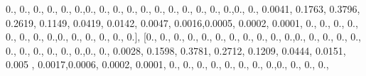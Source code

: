 \documentclass[
]{book}
\newenvironment{Shaded}{\begin{snugshade}}{\end{snugshade}}
\newcommand{\FloatTok}[1]{\textcolor[rgb]{0.00,0.00,0.81}{#1}}
\newcommand{\NormalTok}[1]{#1}
\begin{document}
\begin{Shaded}
\begin{Highlighting}[]
\FloatTok{0.}\NormalTok{, }\FloatTok{0.}\NormalTok{, }\FloatTok{0.}\NormalTok{, }\FloatTok{0.}\NormalTok{, }\FloatTok{0.}\NormalTok{, }\FloatTok{0.}\NormalTok{,}\FloatTok{0.}\NormalTok{, }\FloatTok{0.}\NormalTok{, }\FloatTok{0.}\NormalTok{, }\FloatTok{0.}\NormalTok{, }\FloatTok{0.}\NormalTok{, }\FloatTok{0.}\NormalTok{, }\FloatTok{0.}\NormalTok{, }\FloatTok{0.}\NormalTok{, }\FloatTok{0.}\NormalTok{, }\FloatTok{0.}\NormalTok{, }\FloatTok{0.}\NormalTok{,}\FloatTok{0.}\NormalTok{, }\FloatTok{0.}\NormalTok{,}
\FloatTok{0.0041}\NormalTok{, }\FloatTok{0.1763}\NormalTok{, }\FloatTok{0.3796}\NormalTok{, }\FloatTok{0.2619}\NormalTok{, }\FloatTok{0.1149}\NormalTok{, }\FloatTok{0.0419}\NormalTok{, }\FloatTok{0.0142}\NormalTok{, }\FloatTok{0.0047}\NormalTok{, }\FloatTok{0.0016}\NormalTok{,}\FloatTok{0.0005}\NormalTok{,}
\FloatTok{0.0002}\NormalTok{, }\FloatTok{0.0001}\NormalTok{, }\FloatTok{0.}\NormalTok{, }\FloatTok{0.}\NormalTok{, }\FloatTok{0.}\NormalTok{, }\FloatTok{0.}\NormalTok{, }\FloatTok{0.}\NormalTok{, }\FloatTok{0.}\NormalTok{, }\FloatTok{0.}\NormalTok{, }\FloatTok{0.}\NormalTok{,}\FloatTok{0.}\NormalTok{, }\FloatTok{0.}\NormalTok{, }\FloatTok{0.}\NormalTok{, }\FloatTok{0.}\NormalTok{, }\FloatTok{0.}\NormalTok{, }\FloatTok{0.}\NormalTok{], [}\FloatTok{0.}\NormalTok{, }\FloatTok{0.}\NormalTok{,}
\FloatTok{0.}\NormalTok{, }\FloatTok{0.}\NormalTok{, }\FloatTok{0.}\NormalTok{, }\FloatTok{0.}\NormalTok{, }\FloatTok{0.}\NormalTok{, }\FloatTok{0.}\NormalTok{, }\FloatTok{0.}\NormalTok{, }\FloatTok{0.}\NormalTok{, }\FloatTok{0.}\NormalTok{,}\FloatTok{0.}\NormalTok{, }\FloatTok{0.}\NormalTok{, }\FloatTok{0.}\NormalTok{, }\FloatTok{0.}\NormalTok{, }\FloatTok{0.}\NormalTok{, }\FloatTok{0.}\NormalTok{, }\FloatTok{0.}\NormalTok{, }\FloatTok{0.}\NormalTok{, }\FloatTok{0.}\NormalTok{, }\FloatTok{0.}\NormalTok{,}
\FloatTok{0.}\NormalTok{,}\FloatTok{0.}\NormalTok{, }\FloatTok{0.}\NormalTok{, }\FloatTok{0.0028}\NormalTok{, }\FloatTok{0.1598}\NormalTok{, }\FloatTok{0.3781}\NormalTok{, }\FloatTok{0.2712}\NormalTok{, }\FloatTok{0.1209}\NormalTok{, }\FloatTok{0.0444}\NormalTok{, }\FloatTok{0.0151}\NormalTok{, }\FloatTok{0.005}\NormalTok{ ,}
\FloatTok{0.0017}\NormalTok{,}\FloatTok{0.0006}\NormalTok{, }\FloatTok{0.0002}\NormalTok{, }\FloatTok{0.0001}\NormalTok{, }\FloatTok{0.}\NormalTok{, }\FloatTok{0.}\NormalTok{, }\FloatTok{0.}\NormalTok{, }\FloatTok{0.}\NormalTok{, }\FloatTok{0.}\NormalTok{, }\FloatTok{0.}\NormalTok{, }\FloatTok{0.}\NormalTok{, }\FloatTok{0.}\NormalTok{,}\FloatTok{0.}\NormalTok{, }\FloatTok{0.}\NormalTok{, }\FloatTok{0.}\NormalTok{, }\FloatTok{0.}\NormalTok{,}

\end{Highlighting}
\end{Shaded}
\end{document}
